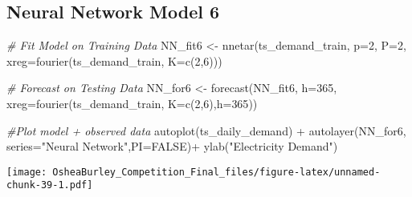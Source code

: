 \documentclass[
]{article}
\newenvironment{Shaded}{\begin{snugshade}}{\end{snugshade}}
\newcommand{\AttributeTok}[1]{\textcolor[rgb]{0.77,0.63,0.00}{#1}}
\newcommand{\CommentTok}[1]{\textcolor[rgb]{0.56,0.35,0.01}{\textit{#1}}}
\newcommand{\ConstantTok}[1]{\textcolor[rgb]{0.00,0.00,0.00}{#1}}
\newcommand{\DecValTok}[1]{\textcolor[rgb]{0.00,0.00,0.81}{#1}}
\newcommand{\FunctionTok}[1]{\textcolor[rgb]{0.00,0.00,0.00}{#1}}
\newcommand{\NormalTok}[1]{#1}
\newcommand{\OtherTok}[1]{\textcolor[rgb]{0.56,0.35,0.01}{#1}}
\newcommand{\SpecialCharTok}[1]{\textcolor[rgb]{0.00,0.00,0.00}{#1}}
\newcommand{\StringTok}[1]{\textcolor[rgb]{0.31,0.60,0.02}{#1}}
\begin{document}
\begin{Shaded}
\end{Shaded}

\hypertarget{neural-network-model-6}{%
\subsection{Neural Network Model 6}\label{neural-network-model-6}}

\begin{Shaded}
\begin{Highlighting}[]
\CommentTok{\# Fit Model on Training Data}
\NormalTok{NN\_fit6 }\OtherTok{\textless{}{-}} \FunctionTok{nnetar}\NormalTok{(ts\_demand\_train,}
                 \AttributeTok{p=}\DecValTok{2}\NormalTok{,}
                 \AttributeTok{P=}\DecValTok{2}\NormalTok{,}
                 \AttributeTok{xreg=}\FunctionTok{fourier}\NormalTok{(ts\_demand\_train, }\AttributeTok{K=}\FunctionTok{c}\NormalTok{(}\DecValTok{2}\NormalTok{,}\DecValTok{6}\NormalTok{)))}

\CommentTok{\# Forecast on Testing Data}
\NormalTok{NN\_for6 }\OtherTok{\textless{}{-}} \FunctionTok{forecast}\NormalTok{(NN\_fit6, }
                   \AttributeTok{h=}\DecValTok{365}\NormalTok{,}
                   \AttributeTok{xreg=}\FunctionTok{fourier}\NormalTok{(ts\_demand\_train, }
                                          \AttributeTok{K=}\FunctionTok{c}\NormalTok{(}\DecValTok{2}\NormalTok{,}\DecValTok{6}\NormalTok{),}\AttributeTok{h=}\DecValTok{365}\NormalTok{))}


\CommentTok{\#Plot model + observed data}
\FunctionTok{autoplot}\NormalTok{(ts\_daily\_demand) }\SpecialCharTok{+}
  \FunctionTok{autolayer}\NormalTok{(NN\_for6, }\AttributeTok{series=}\StringTok{"Neural Network"}\NormalTok{,}\AttributeTok{PI=}\ConstantTok{FALSE}\NormalTok{)}\SpecialCharTok{+}
  \FunctionTok{ylab}\NormalTok{(}\StringTok{"Electricity Demand"}\NormalTok{) }
\end{Highlighting}
\end{Shaded}

\texttt{[image: OsheaBurley\_Competition\_Final\_files/figure-latex/unnamed-chunk-39-1.pdf]}
\end{document}
